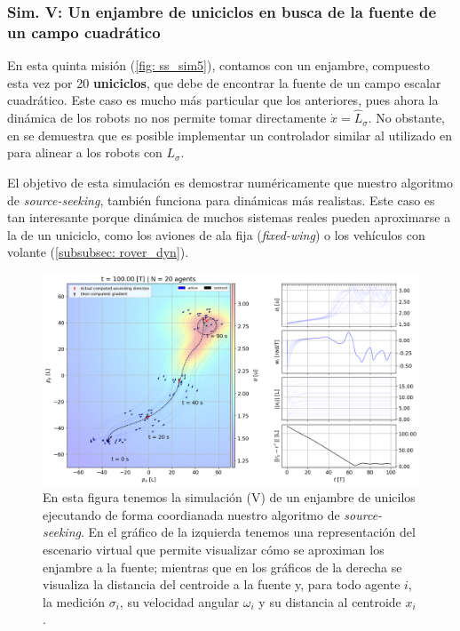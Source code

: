 \newpage

\subsubsection*{Sim. V: Un enjambre de uniciclos en busca de la fuente de un campo cuadrático}

En esta quinta misión (\autoref{fig: ss_sim5}), contamos con un enjambre, compuesto esta vez por 20 \textbf{uniciclos}, que debe de encontrar la fuente de un campo escalar cuadrático. Este caso es mucho más particular que los anteriores, pues ahora la dinámica de los robots no nos permite tomar directamente $\dot x = \hat L_\sigma$. No obstante, en \cite{tfg_antonio} se demuestra que es posible implementar un controlador similar al utilizado en \cite{gvf_classic} para alinear a los robots con $L_\sigma$.

El objetivo de esta simulación es demostrar numéricamente que nuestro algoritmo de \textit{source-seeking}, también funciona para dinámicas más realistas. Este caso es tan interesante porque dinámica de muchos sistemas reales pueden aproximarse a la de un uniciclo, como los aviones de ala fija (\textit{fixed-wing}) o los vehículos con volante (\autoref{subsubsec: rover_dyn}).

\newpage

\begin{figure}[!h]
\centering
\includegraphics[trim={0cm 0.0cm 0cm 0.0cm}, clip, width=1\columnwidth]{./fig/ss_sim5.png}
\caption{En esta figura tenemos la simulación (V) de un enjambre de unicilos ejecutando de forma coordianada nuestro algoritmo de \textit{source-seeking}. En el gráfico de la izquierda tenemos una representación del escenario virtual que permite visualizar cómo se aproximan los enjambre a la fuente; mientras que en los gráficos de la derecha se visualiza la distancia del centroide a la fuente y, para todo agente $i$, la medición $\sigma_i$, su velocidad angular $\omega_i$ y su distancia al centroide $x_i$.}
\label{fig: ss_sim5}
\end{figure}


